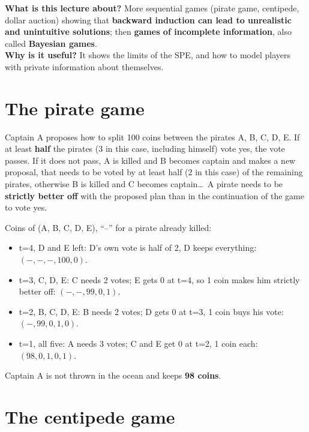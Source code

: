 \documentclass[11pt,a4paper,openany]{book}
\begin{document}
\begin{rembox}[title=In a nutshell]
\textbf{What is this lecture about?} More sequential games (pirate game, centipede, dollar
auction) showing that \textbf{backward induction can lead to unrealistic and unintuitive
solutions}; then \textbf{games of incomplete information}, also called \textbf{Bayesian
games}. \\
\textbf{Why is it useful?} It shows the limits of the SPE, and how to model players with
private information about themselves.
\end{rembox}

\section{The pirate game}

\begin{exbox}[title=Rules]
Captain A proposes how to split 100 coins between the pirates A, B, C, D, E. If at least
\textbf{half} the pirates (3 in this case, including himself) vote yes, the vote passes. If it
does not pass, A is killed and B becomes captain and makes a new proposal, that needs to be
voted by at least half (2 in this case) of the remaining pirates, otherwise B is killed and C
becomes captain\dots\ A pirate needs to be \textbf{strictly better off} with the proposed plan
than in the continuation of the game to vote yes.
\end{exbox}

\begin{propbox}[title=SPE by backward induction]
Coins of (A, B, C, D, E), ``--'' for a pirate already killed:
\begin{itemize}
  \item t=4, D and E left: D's own vote is half of 2, D keeps everything:
        $(-, -, -, 100, 0)$.
  \item t=3, C, D, E: C needs 2 votes; E gets 0 at t=4, so 1 coin makes him strictly better
        off: $(-, -, 99, 0, 1)$.
  \item t=2, B, C, D, E: B needs 2 votes; D gets 0 at t=3, 1 coin buys his vote:
        $(-, 99, 0, 1, 0)$.
  \item t=1, all five: A needs 3 votes; C and E get 0 at t=2, 1 coin each:
        $(98, 0, 1, 0, 1)$.
\end{itemize}
Captain A is not thrown in the ocean and keeps \textbf{98 coins}.
\end{propbox}


\section{The centipede game}
\end{document}
